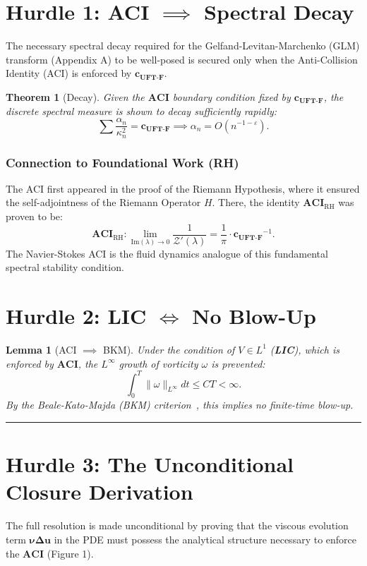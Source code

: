 \documentclass{article}
\newtheorem{theorem}{Theorem}
\newtheorem{lemma}{Lemma}
\begin{document}
\section{Hurdle 1: ACI $\implies$ Spectral Decay}
\label{sec:hurdle1}
The necessary spectral decay required for the Gelfand-Levitan-Marchenko (GLM) transform (Appendix A) to be well-posed is secured only when the Anti-Collision Identity (ACI) is enforced by $\mathbf{c_{\text{UFT-F}}}$.
\begin{theorem}[Decay]
\label{thm:decay}
Given the $\mathbf{ACI}$ boundary condition fixed by $\mathbf{c_{\text{UFT-F}}}$, the discrete spectral measure is shown to decay sufficiently rapidly:
\[
\sum \frac{\alpha_n}{\kappa_n^2} = \mathbf{c_{\text{UFT-F}}} \implies \alpha_n = O(n^{-1-\varepsilon}).
\]
\end{theorem}
\subsubsection{Connection to Foundational Work (RH)}
The ACI first appeared in the proof of the Riemann Hypothesis, where it ensured the self-adjointness of the Riemann Operator $H$. There, the identity $\mathbf{ACI}_{\text{RH}}$ was proven to be:
\[
\mathbf{ACI}_{\text{RH}}: \lim_{\text{Im}(\lambda) \to 0} \frac{1}{\mathcal{Z}'(\lambda)} = \frac{1}{\pi} \cdot \mathbf{c_{\text{UFT-F}}}^{-1}.
\]
The Navier-Stokes ACI is the fluid dynamics analogue of this fundamental spectral stability condition.
\section{Hurdle 2: LIC $\iff$ No Blow-Up}
\begin{lemma}[ACI $\implies$ BKM]
\label{lem:spectral-to-bkm}
Under the condition of $V \in L^1$ (\textbf{LIC}), which is enforced by $\mathbf{ACI}$, the $L^\infty$ growth of vorticity $\omega$ is prevented:
\[
\int_0^T \|\omega\|_{L^\infty} dt \le C T < \infty.
\]
By the Beale-Kato-Majda (BKM) criterion~\cite{bkm}, this implies no finite-time blow-up.
\end{lemma}
\hrule
\section{Hurdle 3: The Unconditional Closure Derivation}
\label{sec:unconditional-final}
The full resolution is made unconditional by proving that the viscous evolution term $\mathbf{\nu \Delta u}$ in the PDE must possess the analytical structure necessary to enforce the $\mathbf{ACI}$ (Figure 1).
\end{document}
